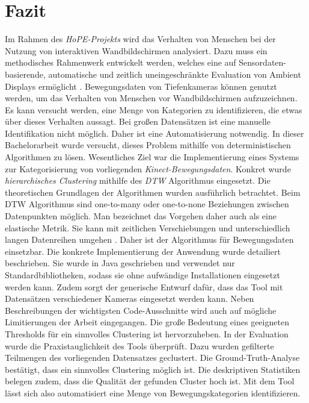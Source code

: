\chapter{Fazit}
\label{chapter7}
Im Rahmen des \emph{HoPE-Projekts} wird das Verhalten von Menschen
bei der Nutzung von interaktiven Wandbildschirmen analysiert.
Dazu muss ein methodisches Rahmenwerk entwickelt werden, welches eine auf Sensordaten-basierende,
automatische und zeitlich uneingeschränkte Evaluation von Ambient Displays ermöglicht \citep{unibw_honeypot-effekt_2021}.
Bewegungsdaten von Tiefenkameras können genutzt werden,
um das Verhalten von Menschen vor Wandbildschirmen aufzuzeichnen.
Es kann versucht werden, eine Menge von Kategorien zu identifizieren,
die etwas über dieses Verhalten aussagt.
Bei großen Datensätzen ist eine manuelle Identifikation nicht möglich.
Daher ist eine Automatisierung notwendig.
In dieser Bachelorarbeit wurde versucht, dieses Problem mithilfe von deterministischen Algorithmen zu lösen.
Wesentliches Ziel war die Implementierung eines Systems zur Kategorisierung von vorliegenden \emph{Kinect-Bewegungsdaten}.
Konkret wurde \emph{hierarchisches Clustering} mithilfe des \emph{\ac{DTW}} Algorithmus eingesetzt.
Die theoretischen Grundlagen der Algorithmen wurden ausführlich betrachtet. 
Beim \ac{DTW} Algorithmus sind one-to-many oder one-to-none Beziehungen zwischen Datenpunkten möglich.
Man bezeichnet das Vorgehen daher auch als eine elastische Metrik.
Sie kann mit zeitlichen Verschiebungen und unterschiedlich langen Datenreihen umgehen \citep{aghabozorgi_time-series_2015}.
Daher ist der Algorithmus für Bewegungsdaten einsetzbar.
Die konkrete Implementierung der Anwendung wurde detailiert beschrieben.
Sie wurde in Java geschrieben und verwendet nur Standardbibliotheken,
sodass sie ohne aufwändige Installationen eingesetzt werden kann.
Zudem sorgt der generische Entwurf dafür, dass das Tool mit Datensätzen verschiedener Kameras eingesetzt werden kann.
Neben Beschreibungen der wichtigsten Code-Ausschnitte
wird auch auf mögliche Limitierungen der Arbeit eingegangen.
Die große Bedeutung eines geeigneten Thresholds für ein sinnvolles Clustering ist hervorzuheben.
In der Evaluation wurde die Praxistauglichkeit des Tools überprüft.
Dazu wurden gefilterte Teilmengen des vorliegenden Datensatzes geclustert.
Die Ground-Truth-Analyse bestätigt, dass ein sinnvolles Clustering möglich ist.
Die deskriptiven Statistiken belegen zudem, dass die Qualität der gefunden Cluster hoch ist.
Mit dem Tool lässt sich also automatisiert eine Menge von Bewegungskategorien identifizieren.
